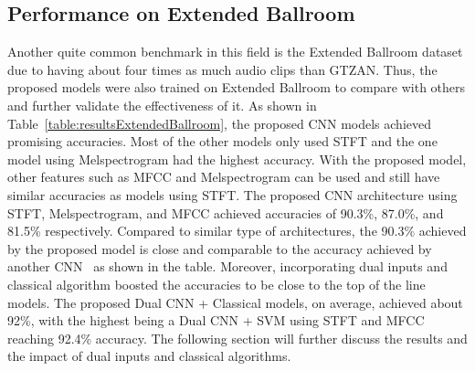 \documentclass[10pt,twocolumn,letterpaper]{article}
\begin{document}
	\subsection{Performance on Extended Ballroom} %
	
	Another quite common benchmark in this field is the Extended Ballroom dataset due to having about four times as much audio clips than GTZAN. Thus, the proposed models were also trained on Extended Ballroom to compare with others and further validate the effectiveness of it. As shown in Table~\ref{table:resultsExtendedBallroom}, the proposed CNN models achieved promising accuracies. Most of the other models only used STFT and the one model using Melspectrogram had the highest accuracy. With the proposed model, other features such as MFCC and Melspectrogram can be used and still have similar accuracies as models using STFT. The proposed CNN architecture using STFT, Melspectrogram, and MFCC achieved accuracies of 90.3\%, 87.0\%, and 81.5\% respectively. Compared to similar type of architectures, the 90.3\% achieved by the proposed model is close and comparable to the accuracy achieved by another CNN~\cite{yang2020parallel} as shown in the table. Moreover, incorporating dual inputs and classical algorithm boosted the accuracies to be close to the top of the line models. The proposed Dual CNN + Classical models, on average, achieved about 92\%, with the highest being a Dual CNN + SVM using STFT and MFCC reaching 92.4\% accuracy. The following section will further discuss the results and the impact of dual inputs and classical algorithms.
	
\end{document}
